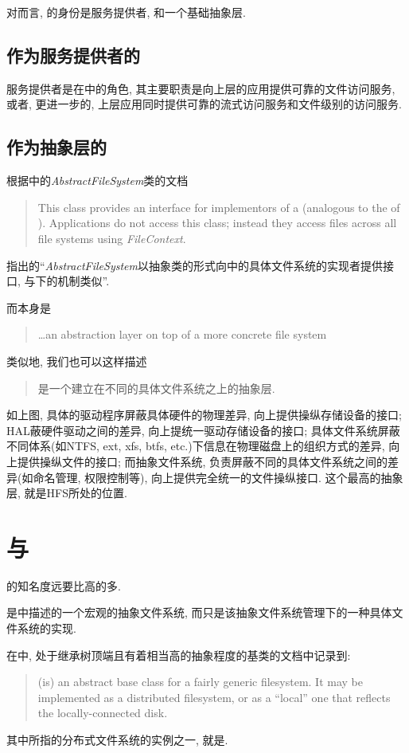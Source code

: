 对\Hadoop 而言, \HFS 的身份是服务提供者, 和一个基础抽象层.

\subsection{作为服务提供者的\HFS}
\label{ssec:hfs-intro:svr}

服务提供者是\HFS 在\Hadoop 中的角色,
其主要职责是向上层的\Hadoop 应用提供可靠的文件访问服务, 或者, 更进一步的,
上层应用同时提供可靠的流式访问服务和文件级别的访问服务.

\subsection{作为抽象层的\HFS}
\label{ssec:hfs:al}

根据\HadoopFS 中的\emph{AbstractFileSystem}类的文档
\begin{quote}
This class provides an interface for implementors of a \HadoopFS
(analogous to the \VFS\space of \Unix). Applications do not access this class;
instead they access files across all file systems using \emph{FileContext}.
\end{quote}
指出的``\emph{AbstractFileSystem}以抽象类的形式向\HFS 中的具体文件系统的实现者提供接口,
与\Unix 下\VFS 的机制类似''.

而\VFS 本身是
\begin{quote}
    \ldots an abstraction layer on top of a more concrete file system
\end{quote}

类似地, 我们也可以这样描述\HFS
\begin{quote}
    \HFS 是一个建立在不同的具体文件系统之上的抽象层.
\end{quote}

\blankfigure{}

如上图,
具体的驱动程序屏蔽具体硬件的物理差异, 向上提供操纵存储设备的接口;
HAL蔽硬件驱动之间的差异, 向上提统一驱动存储设备的接口;
具体文件系统屏蔽不同体系(如NTFS, ext, xfs, btfs, etc.)下信息在物理磁盘上的组织方式的差异,
向上提供操纵文件的接口;
而抽象文件系统, 负责屏蔽不同的具体文件系统之间的差异(如命名管理, 权限控制等),
向上提供完全统一的文件操纵接口. 这个最高的抽象层, 就是HFS所处的位置.

\section{\HFS 与\HDFS}

\HDFS 的知名度远要比\HFS 高的多.

\HadoopFS 是中描述的一个宏观的抽象文件系统,
而\HadoopDFS 只是该抽象文件系统管理下的一种具体文件系统的实现.

在\HFS 中, 处于继承树顶端且有着相当高的抽象程度的基类\FS 的文档中记录到:

\begin{quote}
(\FS\space is) an abstract base class for a fairly generic filesystem. It
may be implemented as a distributed filesystem, or as a ``local''
one that reflects the locally-connected disk.
\end{quote}

其中所指的分布式文件系统的实例之一, 就是\HDFS.
